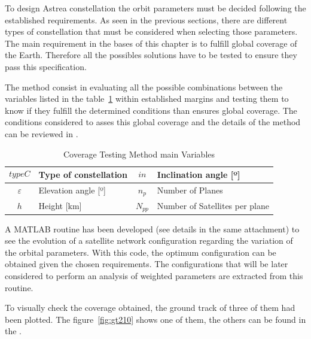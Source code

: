 
To design Astrea constellation the orbit parameters must be decided following the established requirements. As seen in the previous sections, there are different types of constellation that must be considered when selecting those parameters. The main requirement in the bases of this chapter is to fulfill global coverage of the Earth. Therefore all the possibles solutions have to be tested to ensure they pass this specification.

The method consist in evaluating all the possible combinations between the variables listed in the table~\ref{t:CovVar} within established margins and  testing them to know if they fulfill the determined conditions than ensures global coverage. The conditions considered to asses this global coverage and the details of the method can be reviewed in \cite[Chapter 3, Section 4]{annex1}. %

\begin{table}[H]
\centering
\begin{tabular}{|c|l|c|l|}
\hline
$$typeC$$     & Type of constellation    & $$in$$  & Inclination angle {[}º{]} \\ \hline
$\varepsilon$ & Elevation angle {[}º{]}  & $n_{p}$ & Number of Planes                          \\ \hline
$$h$$         & Height  {[}km{]}  & $N_{pp}$ & Number of Satellites per plane            \\ \hline
\end{tabular}
\caption{Coverage Testing Method main Variables}
\label{t:CovVar}
\end{table}  

A MATLAB routine has been developed (see details in the same attachment) to see the evolution of a satellite network configuration regarding the variation of the orbital parameters. With this code, the optimum configuration can be obtained given the chosen requirements. The configurations that will be later considered to perform an analysis of weighted parameters are extracted from this routine.

To visually check the coverage obtained, the ground track of three of them had been plotted. The figure~\ref{fig:gt210} shows one of them, the others can be found in the \cite[Chapter 2, Section 4]{annex1}. 

